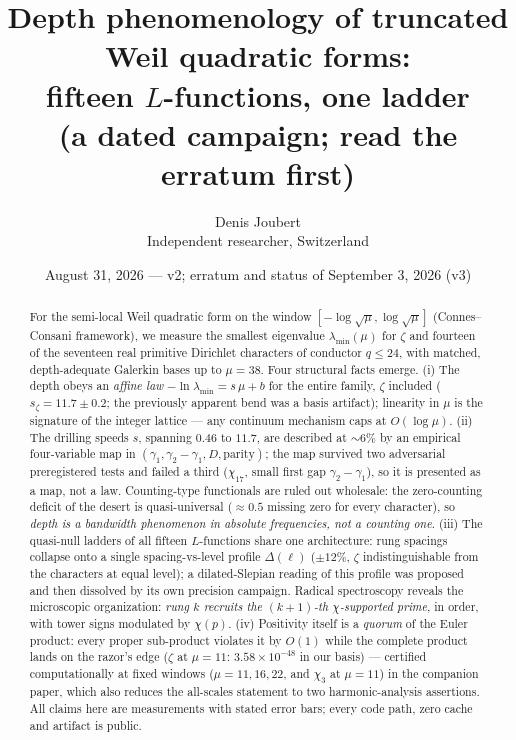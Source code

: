 \documentclass[10pt]{article}
\title{\bfseries Depth phenomenology of truncated Weil quadratic forms:\\ fifteen $L$-functions, one ladder\\[3pt] \normalsize\mdseries (a dated campaign; read the erratum first)}
\author{Denis Joubert\\ \small Independent researcher, Switzerland}
\date{August 31, 2026 --- v2; erratum and status of September 3, 2026 (v3)}
\begin{document}
\maketitle

\begin{abstract}
\noindent
For the semi-local Weil quadratic form on the window $[-\log\sqrt\mu,\log\sqrt\mu]$ (Connes--Consani framework), we measure the smallest
eigenvalue $\lambda_{\min}(\mu)$ for $\zeta$ and fourteen of the seventeen real
primitive Dirichlet characters of conductor $q\le24$, with matched,
depth-adequate Galerkin bases up to $\mu=38$. Four structural facts
emerge. (i) The depth obeys an \emph{affine law}
$-\ln\lambda_{\min}=s\,\mu+b$ for the entire family, $\zeta$ included
($s_\zeta=11.7\pm0.2$; the previously apparent bend was a basis
artifact); linearity in $\mu$ is the signature of the integer lattice ---
any continuum mechanism caps at $O(\log\mu)$. (ii) The drilling speeds
$s$, spanning $0.46$ to $11.7$, are described at $\sim\!6\%$ by an
empirical four-variable map in $(\gamma_1,\gamma_2-\gamma_1,D,
\text{parity})$; the map survived two adversarial preregistered tests and
failed a third ($\chi_{17}$, small first gap $\gamma_2-\gamma_1$), so it is presented as a
map, not a law. Counting-type functionals are ruled out wholesale: the
zero-counting deficit of the desert is quasi-universal
($\approx0.5$ missing zero for every character), so \emph{depth is
a bandwidth phenomenon in absolute frequencies, not a counting one}.
(iii) The quasi-null ladders of all fifteen $L$-functions share one
architecture: rung spacings collapse onto a single spacing-vs-level
profile $\Delta(\ell)$ ($\pm12\%$, $\zeta$ indistinguishable from the
characters at equal level); a dilated-Slepian reading of this profile was
proposed and then dissolved by its own precision campaign. Radical
spectroscopy reveals the microscopic organization: \emph{rung $k$
recruits the $(k{+}1)$-th $\chi$-supported prime}, in order, with tower
signs modulated by $\chi(p)$. (iv) Positivity itself is a \emph{quorum}
of the Euler product: every proper sub-product violates it by $O(1)$
while the complete product lands on the razor's edge ($\zeta$ at
$\mu=11$: $3.58\times10^{-48}$ in our basis) --- certified
computationally at fixed windows ($\mu=11,16,22$, and $\chi_3$ at
$\mu=11$) in the companion paper, which also reduces the all-scales
statement to two harmonic-analysis assertions. All claims here are
measurements with stated error bars; every code path, zero cache and
artifact is public.
\end{abstract}
\end{document}
